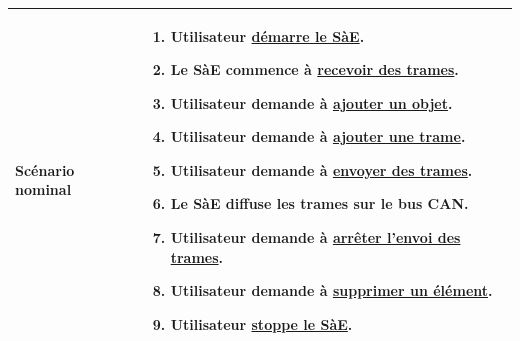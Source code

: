 \begin{longtable}[l]{|p{3cm}|p{11.7cm}|}
    Scénario nominal &
    \begin{enumerate}
        \item Utilisateur \underline{démarre le SàE}.
        \item Le SàE commence à \underline{recevoir des trames}.
        \item Utilisateur demande à \underline{ajouter un objet}.
        \item Utilisateur demande à \underline{ajouter une trame}.
        \item Utilisateur demande à \underline{envoyer des trames}.
        \item Le SàE diffuse les trames sur le bus CAN.
        \item Utilisateur demande à \underline{arrêter l'envoi des trames}.
        \item Utilisateur demande à \underline{supprimer un élément}.
        \item Utilisateur \underline{stoppe le SàE}.
    \end{enumerate} \\
    \hline


\end{longtable}
